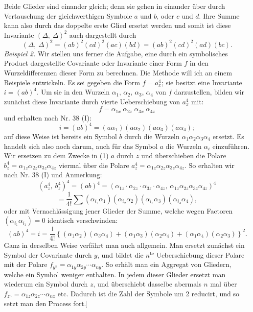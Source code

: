 \documentclass[11pt]{article}
\providecommand{\weberpage}[1]{}
\providecommand{\weq}[2]{\begin{equation}\tag{#1}#2\end{equation}}
\let\Delta\varDelta
\begin{document}
\weberpage{41}
Beide Glieder sind einander gleich; denn sie gehen in einander über
durch Vertauschung der gleichwerthigen Symbole $a$ und $b$, oder $c$
und $d$. Ihre Summe kann also durch das doppelte erste Glied ersetzt
werden und somit ist diese Invariante $(\Delta,\ \Delta)^2$ auch dargestellt durch
\[
(\Delta,\ \Delta)^2 = (ab)^2(cd)^2(ac)(bd) = (ab)^2(cd)^2(ad)(bc).
\]
\textit{Beispiel 2.} Wir stellen uns ferner die Aufgabe, eine durch ein
symbolisches Product dargestellte Covariante oder Invariante einer
Form $f$ in den Wurzeldifferenzen dieser Form zu berechnen. Die
Methode will ich an einem Beispiele entwickeln. Es sei gegeben die
Form $f = a_x^4$; sie besitzt eine Invariante $i = (ab)^4$. Um sie in den
Wurzeln $\alpha_1$, $\alpha_2$, $\alpha_3$, $\alpha_4$ von $f$ darzustellen, bilden wir zunächst diese
Invariante durch vierte Ueberschiebung von $a_x^4$ mit:
\[
f = \alpha_{1x}\ \alpha_{2x}\ \alpha_{3x}\ \alpha_{4x}
\]
und erhalten nach Nr. 38 (I):
\weq{1}{i = (ab)^4 = (a\alpha_1)(a\alpha_2)(a\alpha_3)(a\alpha_4);}
auf diese Weise ist bereits ein Symbol $b$ durch die Wurzeln $\alpha_1\alpha_2\alpha_3\alpha_4$
ersetzt. Es handelt sich also noch darum, auch für das Symbol $a$ die
Wurzeln $\alpha_i$ einzuführen. Wir ersetzen zu dem Zwecke in (1) $a$ durch
$z$ und überschieben die Polare $b_z^4 = \alpha_{1z}\alpha_{2z}\alpha_{3z}\alpha_{4z}$ viermal über die
Polare $a_z^4 = \alpha_{1z}\alpha_{2z}\alpha_{3z}\alpha_{4z}$. So erhalten wir nach Nr. 38 (I) und An\-merkung:
\[
(a_z^4,\ b_z^4)^4 = (ab)^4 = (\alpha_{1z}\cdot\alpha_{2z}\cdot\alpha_{3z}\cdot\alpha_{4z},\ \alpha_{1z}\alpha_{2z}\alpha_{3z}\alpha_{4z})^4
\]
\[
= \frac{1}{4!}\sum (\alpha_{i_1}\alpha_1)(\alpha_{i_2}\alpha_2)(\alpha_{i_3}\alpha_3)(\alpha_{i_4}\alpha_4),
\]
oder mit Vernachlässigung jener Glieder der Summe, welche wegen
Factoren $(\alpha_{i_1}\alpha_{i_1}) = 0$ identisch verschwinden:
\[
(ab)^4 = i = \frac{1}{4!}\left\{(\alpha_1\alpha_2)(\alpha_3\alpha_4) + (\alpha_1\alpha_3)(\alpha_2\alpha_4) + (\alpha_1\alpha_4)(\alpha_2\alpha_3)\right\}^2.
\]
Ganz in derselben Weise verfährt man auch allgemein. Man ersetzt
zunächst ein Symbol der Covariante durch $y$, und bildet die
$n^{\text{te}}$ Ueberschiebung dieser Polare mit der Polare $f_{y^n} = \alpha_{1y}\alpha_{2y}\cdots\alpha_{ny}$.
So erhält man ein Aggregat von Gliedern, welche ein Symbol
weniger enthalten. In jedem dieser Glieder ersetzt man wiederum ein
Symbol durch $z$, und überschiebt dasselbe abermals $n$ mal über
$f_{z^n} = \alpha_{1z}\alpha_{2z}\cdots\alpha_{nz}$ etc. Dadurch ist die Zahl der Symbole um 2
reducirt, und so setzt man den Process fort.] %
\end{document}
